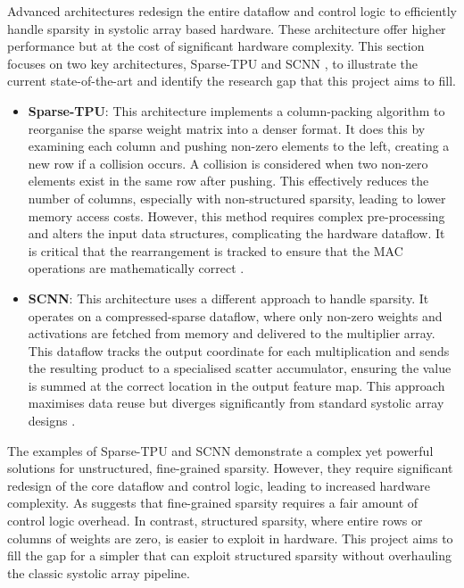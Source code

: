 \documentclass[12pt, a4paper, ukenglish]{article}
\begin{document}
        Advanced architectures redesign the entire dataflow and control logic to efficiently handle sparsity in systolic array based hardware. These architecture offer higher performance but at the cost of significant hardware complexity. This section focuses on two key architectures, Sparse-TPU \cite{he_sparse-tpu_2020} and SCNN \cite{parashar_scnn_2017}, to illustrate the current state-of-the-art and identify the research gap that this project aims to fill. 

        \begin{itemize}
            \item \textbf{Sparse-TPU}: This architecture implements a column-packing algorithm to reorganise the sparse weight matrix into a denser format. It does this by examining each column and pushing non-zero elements to the left, creating a new row if a collision occurs. A collision is considered when two non-zero elements exist in the same row after pushing. This effectively reduces the number of columns, especially with non-structured sparsity, leading to lower memory access costs. However, this method requires complex pre-processing and alters the input data structures, complicating the hardware dataflow. It is critical that the rearrangement is tracked to ensure that the MAC operations are mathematically correct \cite{he_sparse-tpu_2020}. 
            \item \textbf{SCNN}: This architecture uses a different approach to handle sparsity. It operates on a compressed-sparse dataflow, where only non-zero weights and activations are fetched from memory and delivered to the multiplier array. This dataflow tracks the output coordinate for each multiplication and sends the resulting product to a specialised scatter accumulator, ensuring the value is summed at the correct location in the output feature map. This approach maximises data reuse but diverges significantly from standard systolic array designs \cite{parashar_scnn_2017}.
        \end{itemize}
    
        The examples of Sparse-TPU and SCNN demonstrate a complex yet powerful solutions for unstructured, fine-grained sparsity. However, they require significant redesign of the core dataflow and control logic, leading to increased hardware complexity. As \textcite{palacios_systolic_2025} suggests that fine-grained sparsity requires a fair amount of control logic overhead. In contrast, structured sparsity, where entire rows or columns of weights are zero, is easier to exploit in hardware. This project aims to fill the gap for a simpler that can exploit structured sparsity without overhauling the classic systolic array pipeline.
\end{document}
